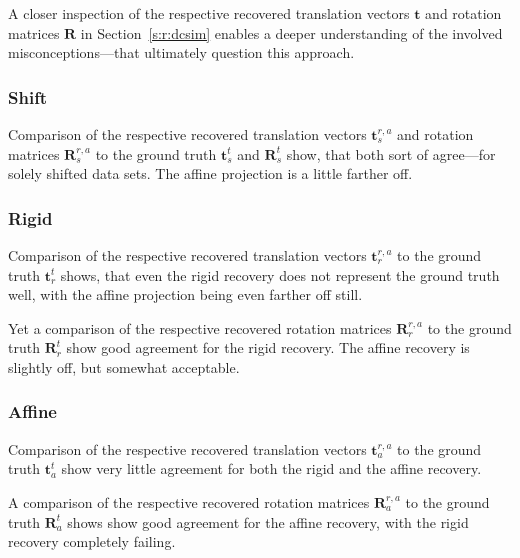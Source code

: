 \documentclass[11pt, a4paper, oneside, twocolumn]{report}
\renewcommand{\b}{\textbf}
\begin{document}
A closer inspection of the respective recovered translation vectors
$\b{t}$ and rotation matrices $\b{R}$ in Section~\ref{s:r:dcsim}
enables a deeper understanding of the involved misconceptions---that
ultimately question this approach.


\subsubsection{Shift}

Comparison of the respective recovered translation vectors
$\b{t}_s^{r,a}$ and rotation matrices $\b{R}_s^{r,a}$ to the ground
truth $\b{t}_s^{t}$ and $\b{R}_s^{t}$ show, that both sort of
agree---for solely shifted data sets. The affine projection is a
little farther off.


\subsubsection{Rigid}

Comparison of the respective recovered translation vectors
$\b{t}_r^{r,a}$ to the ground truth $\b{t}_r^{t}$ shows, that even the
rigid recovery does not represent the ground truth well, with the
affine projection being even farther off still.

Yet a comparison of the respective recovered rotation matrices
$\b{R}_r^{r,a}$ to the ground truth $\b{R}_r^{t}$ show good agreement
for the rigid recovery. The affine recovery is slightly off, but
somewhat acceptable.


\subsubsection{Affine}

Comparison of the respective recovered translation vectors
$\b{t}_a^{r,a}$ to the ground truth $\b{t}_a^{t}$ show very little
agreement for both the rigid and the affine recovery.

A comparison of the respective recovered rotation
matrices $\b{R}_a^{r,a}$ to the ground truth $\b{R}_a^{t}$ shows show
good agreement for the affine recovery, with the rigid recovery
completely failing.



\end{document}

